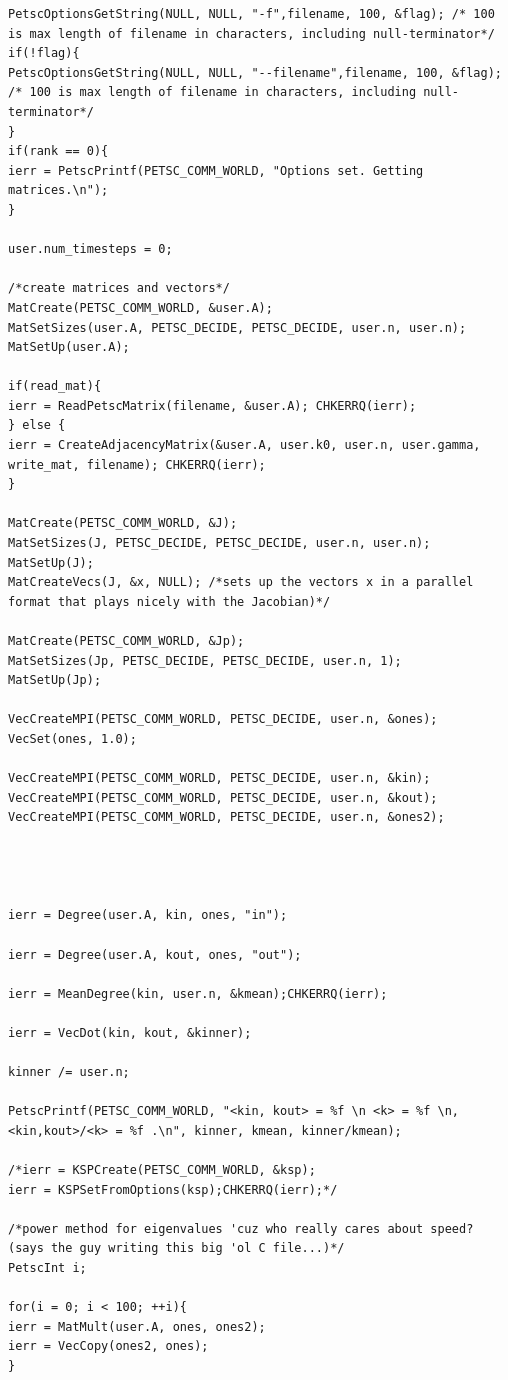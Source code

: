 \documentclass[11pt]{article}
\begin{document}
\begin{Verbatim}[xleftmargin=-3cm]
PetscOptionsGetString(NULL, NULL, "-f",filename, 100, &flag); /* 100 is max length of filename in characters, including null-terminator*/
if(!flag){
PetscOptionsGetString(NULL, NULL, "--filename",filename, 100, &flag); /* 100 is max length of filename in characters, including null-terminator*/
}
if(rank == 0){
ierr = PetscPrintf(PETSC_COMM_WORLD, "Options set. Getting matrices.\n");
}

user.num_timesteps = 0;

/*create matrices and vectors*/
MatCreate(PETSC_COMM_WORLD, &user.A);
MatSetSizes(user.A, PETSC_DECIDE, PETSC_DECIDE, user.n, user.n);
MatSetUp(user.A);

if(read_mat){
ierr = ReadPetscMatrix(filename, &user.A); CHKERRQ(ierr);
} else {
ierr = CreateAdjacencyMatrix(&user.A, user.k0, user.n, user.gamma, write_mat, filename); CHKERRQ(ierr);
}

MatCreate(PETSC_COMM_WORLD, &J);
MatSetSizes(J, PETSC_DECIDE, PETSC_DECIDE, user.n, user.n);
MatSetUp(J);
MatCreateVecs(J, &x, NULL); /*sets up the vectors x in a parallel format that plays nicely with the Jacobian)*/

MatCreate(PETSC_COMM_WORLD, &Jp);
MatSetSizes(Jp, PETSC_DECIDE, PETSC_DECIDE, user.n, 1);
MatSetUp(Jp);

VecCreateMPI(PETSC_COMM_WORLD, PETSC_DECIDE, user.n, &ones);
VecSet(ones, 1.0);

VecCreateMPI(PETSC_COMM_WORLD, PETSC_DECIDE, user.n, &kin);
VecCreateMPI(PETSC_COMM_WORLD, PETSC_DECIDE, user.n, &kout);
VecCreateMPI(PETSC_COMM_WORLD, PETSC_DECIDE, user.n, &ones2);




ierr = Degree(user.A, kin, ones, "in");

ierr = Degree(user.A, kout, ones, "out");

ierr = MeanDegree(kin, user.n, &kmean);CHKERRQ(ierr);

ierr = VecDot(kin, kout, &kinner);

kinner /= user.n;

PetscPrintf(PETSC_COMM_WORLD, "<kin, kout> = %f \n <k> = %f \n, <kin,kout>/<k> = %f .\n", kinner, kmean, kinner/kmean);

/*ierr = KSPCreate(PETSC_COMM_WORLD, &ksp);
ierr = KSPSetFromOptions(ksp);CHKERRQ(ierr);*/

/*power method for eigenvalues 'cuz who really cares about speed? (says the guy writing this big 'ol C file...)*/
PetscInt i;

for(i = 0; i < 100; ++i){
ierr = MatMult(user.A, ones, ones2);
ierr = VecCopy(ones2, ones);
}


\end{Verbatim}
\end{document}
